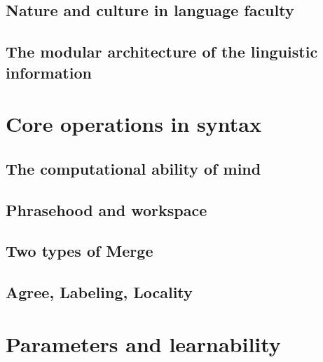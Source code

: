\documentclass[
  a4paper,
  twoside,
  12pt,
  chapterprefix=false,
  bibliography=totocnumbered,
  listof=flat]{scrbook}
\begin{document}
\hypertarget{nature-and-culture-in-language-faculty}{%
\subsection{Nature and culture in language faculty}\label{nature-and-culture-in-language-faculty}}

\hypertarget{the-modular-architecture-of-the-linguistic-information}{%
\subsection{The modular architecture of the linguistic information}\label{the-modular-architecture-of-the-linguistic-information}}

\hypertarget{core-operations-in-syntax}{%
\section{Core operations in syntax}\label{core-operations-in-syntax}}

\hypertarget{the-computational-ability-of-mind}{%
\subsection{The computational ability of mind}\label{the-computational-ability-of-mind}}

\hypertarget{phrasehood-and-workspace}{%
\subsection{Phrasehood and workspace}\label{phrasehood-and-workspace}}

\hypertarget{two-types-of-merge}{%
\subsection{Two types of Merge}\label{two-types-of-merge}}

\hypertarget{agree-labeling-locality}{%
\subsection{Agree, Labeling, Locality}\label{agree-labeling-locality}}

\hypertarget{parameters-and-learnability}{%
\section{Parameters and learnability}\label{parameters-and-learnability}}
\end{document}
